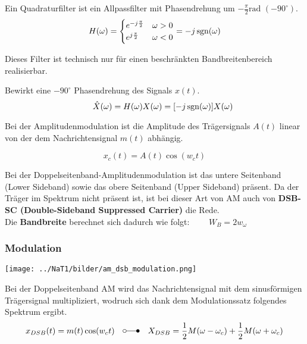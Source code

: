  \label{lti_quadratur}
Ein Quadraturfilter ist ein Allpassfilter mit Phasendrehung um $-\frac{\pi}{2}\text{rad } (-90^\circ)$. \\
$$H(\omega) = \begin{cases}
             	e^{-j \frac{\pi}{2}} & \omega > 0 \\
             	e^{j \frac{\pi}{2}} & \omega < 0
             \end{cases} =
-j \operatorname{sgn}(\omega)$$

Dieses Filter ist technisch nur für einen beschränkten Bandbreitenbereich realisierbar.

 \label{lti_hilbert}
Bewirkt eine $-90^\circ$ Phasendrehung des Signals $x(t)$.
$$\qquad \hat{X}(\omega) = H(\omega)X(\omega) = [-j \operatorname{sgn}(\omega)] X(\omega)$$















\newpage
{}
Bei der Amplitudenmodulation ist die Amplitude des Trägersignals $A(t)$ linear von der dem
Nachrichtensignal $m(t)$ abhängig.

$$ x_c(t) = A(t) \cos(w_c t) $$




Bei der Doppelseitenband-Amplitudenmodulation ist das untere Seitenband (Lower
Sideband) sowie das
obere Seitenband (Upper Sideband) präsent. Da der Träger im Spektrum nicht
präsent ist, ist bei dieser Art von AM auch von \textbf{DSB-SC (Double-Sideband Suppressed Carrier)} die Rede. \\ 
Die \textbf{Bandbreite} berechnet sich dadurch wie folgt: $ \qquad W_B = 2 w_{\omega}$

\subsubsection{Modulation}
\begin{minipage}[c][2.7cm][t]{6.5cm}
    \texttt{[image: ../NaT1/bilder/am\_dsb\_modulation.png]}
\end{minipage}
\begin{minipage}[c][2.7cm][t]{11.5cm}
Bei der Doppelseitenband AM wird das Nachrichtensignal mit dem sinusförmigen Trägersignal
multipliziert, wodruch sich dank dem Modulationssatz folgendes Spektrum ergibt. \\
$$ x_{DSB}(t) =
m(t) \cos(w_c t) \quad \laplace \quad X_{DSB} = \frac{1}{2}M(\omega - \omega_c) + \frac{1}{2}M(\omega + \omega_c)$$
\end{minipage}

